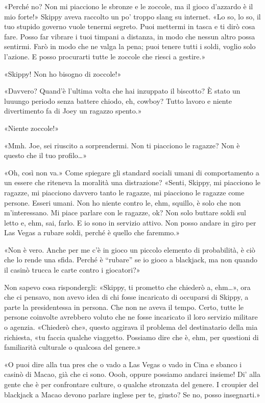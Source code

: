 «Perché no? Non mi piacciono le sbronze e le zoccole, ma il gioco
d'azzardo è il mio forte!» Skippy aveva raccolto un po' troppo slang su
internet. «Lo so, lo so, il tuo stupido governo vuole tenermi segreto.
Puoi mettermi in tasca e ti dirò cosa fare. Posso far vibrare i tuoi
timpani a distanza, in modo che nessun altro possa sentirmi. Farò in
modo che ne valga la pena; puoi tenere tutti i soldi, voglio solo
l'azione. E posso procurarti tutte le zoccole che riesci a gestire.»

«Skippy! Non ho bisogno di zoccole!»

«Davvero? Quand'è l'ultima volta che hai inzuppato il biscotto? È stato
un luuungo periodo senza battere chiodo, eh, cowboy? Tutto lavoro e
niente divertimento fa di Joey un ragazzo spento.»

«Niente zoccole!»

«Mmh. Joe, sei riuscito a sorprendermi. Non ti piacciono le ragazze? Non
è questo che il tuo profilo\ldots»

«Oh, così non va.» Come spiegare gli standard sociali umani di
comportamento a un essere che riteneva la moralità una distrazione?
«Senti, Skippy, mi piacciono le ragazze, mi piacciono davvero tanto le
ragazze, mi piacciono le ragazze come persone. Esseri umani. Non ho
niente contro le, ehm, squillo, è solo che non m'interessano. Mi piace
parlare con le ragazze, ok? Non solo buttare soldi sul letto e, ehm,
sai, farlo. E io sono in servizio attivo. Non posso andare in giro per
Las Vegas a rubare soldi, perché è quello che faremmo.»

«Non è vero. Anche per me c'è in gioco un piccolo elemento di
probabilità, è ciò che lo rende una sfida. Perché è ``rubare'' se io
gioco a blackjack, ma non quando il casinò trucca le carte contro i
giocatori?»

Non sapevo cosa rispondergli: «Skippy, ti prometto che chiederò a,
ehm\ldots», ora che ci pensavo, non avevo idea di chi fosse incaricato
di occuparsi di Skippy, a parte la presidentessa in persona. Che non ne
aveva il tempo. Certo, tutte le persone coinvolte avrebbero voluto che
ne fosse incaricato il loro servizio militare o agenzia. «Chiederò che»,
questo aggirava il problema del destinatario della mia richiesta, «tu
faccia qualche viaggetto. Possiamo dire che è, ehm, per questioni di
familiarità culturale o qualcosa del genere.»

«O puoi dire alla tua pres che o vado a Las Vegas o vado in Cina e
sbanco i casinò di Macao, già che ci sono. Oooh, oppure possiamo andarci
insieme! Di' alla gente che è per confrontare culture, o qualche
stronzata del genere. I croupier del blackjack a Macao devono parlare
inglese per te, giusto? Se no, posso insegnarti.»

